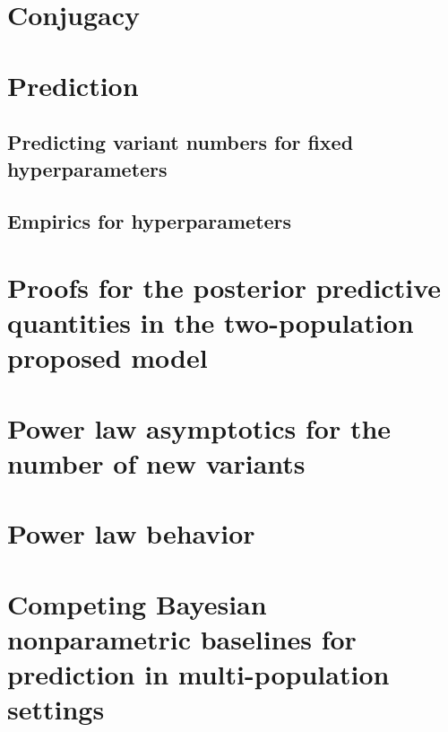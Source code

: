 \section{Conjugacy}
\label{app:conjugacy}



\section{Prediction} 
\label{sec:prediction_all}


	\subsection{Predicting variant numbers for fixed hyperparameters}
	\label{sec:prediction_fixed}
	
	
	\subsection{Empirics for hyperparameters}
	\label{sec:hyperparameter_empirics}
	


\section{Proofs for the posterior predictive quantities in the two-population proposed model}
\label{app:detail_on_prediction}



\section{Power law asymptotics for the number of new variants}
\label{sec:powerlaw}


\section{Power law behavior}
\label{app:power_law}



\section{Competing Bayesian nonparametric baselines for prediction in multi-population settings}
\label{app:method_for_prediction}


